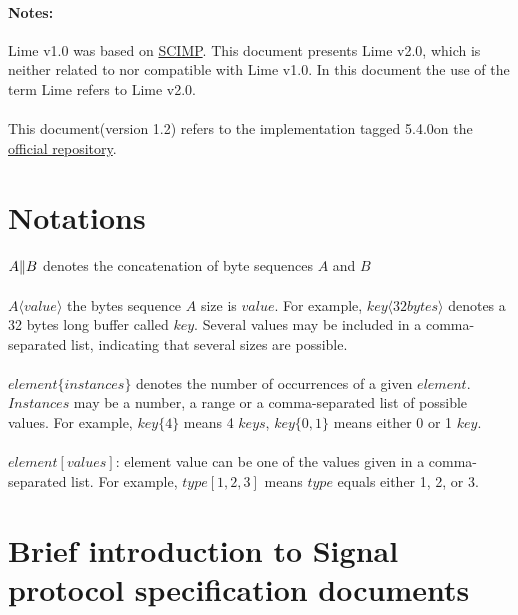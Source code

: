 \documentclass[a4paper,11pt]{article}
\def\currentVersion{1.2}
\def\VersionTag{5.4.0}
\begin{document}
\paragraph{Notes:} Lime v1.0 was based on \href{https://en.wikipedia.org/wiki/Silent_Circle_Instant_Messaging_Protocol}{SCIMP}. This document presents Lime v2.0, which is neither related to nor compatible with Lime v1.0. In this document the use of the term Lime refers to Lime v2.0.
\paragraph{}This document(version \currentVersion) refers to the implementation tagged \VersionTag \hspace{0.5em}on the \href{https://gitlab.linphone.org/BC/public/lime/-/commits/\VersionTag}{official repository}.

\newpage
\section{Notations}
\paragraph{}$A\Arrowvert B$ denotes the concatenation of byte sequences $A$ and $B$
\paragraph{}$A\langle value\rangle$ the bytes sequence $A$ size is $value$. For example, $key\langle 32bytes\rangle $ denotes a 32 bytes long buffer called $key$. Several values may be included in a comma-separated list, indicating that several sizes are possible.
\paragraph{}$element\{ instances\}$ denotes the number of occurrences of a given $element$. $Instances$ may be a number, a range or a comma-separated list of possible values. For example, $key\{ 4\}$ means 4 $keys$, $key\{ 0,1\}$ means either 0 or 1 $key$.
\paragraph{}$element[values]$: element value can be one of the values given in a comma-separated list. For example, $type[1,2,3]$ means $type$ equals either 1, 2, or 3.

\newpage
\section{Brief introduction to Signal protocol specification documents}
\end{document}
